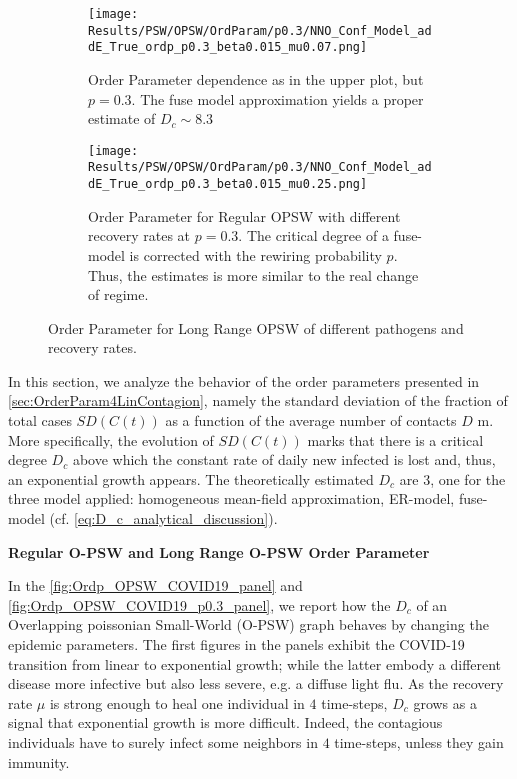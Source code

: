 \documentclass[a4paper,10pt,twoside]{book} %
\theoremstyle{definition}
\begin{document}
\begin{figure}[t]
	\begin{subfigure}[t]{0.48\linewidth}
		\texttt{[image: Results/PSW/OPSW/OrdParam/p0.3/NNO\_Conf\_Model\_addE\_True\_ordp\_p0.3\_beta0.015\_mu0.07.png]}
		\caption{Order Parameter dependence as in the upper plot, but $ p = 0.3$. The fuse model approximation yields a proper estimate of $ D_c \sim 8.3$}
		\label{fig:Ordp_OPSW_Dc8.3_p0.3}
	\end{subfigure}
	\begin{subfigure}[t]{0.48\linewidth}
		\texttt{[image: Results/PSW/OPSW/OrdParam/p0.3/NNO\_Conf\_Model\_addE\_True\_ordp\_p0.3\_beta0.015\_mu0.25.png]}
		\caption{Order Parameter for Regular OPSW with different recovery rates at $p = 0.3$.
		The critical degree of a fuse-model is corrected with the rewiring probability $ p$. Thus, the estimates is more similar to the real change of regime.}
		\label{fig:Ordp_OPSW_highmu_p0.3}
	\end{subfigure}
	\caption{Order Parameter for Long Range OPSW of different pathogens and recovery rates.}
	\label{fig:Ordp_OPSW_COVID19_p0.3_panel}
\end{figure}

In this section, we analyze the behavior of the order parameters presented in \autoref{sec:OrderParam4LinContagion}, namely the standard deviation of the fraction of total cases $SD(C(t))$ as a function of the average number of contacts $D$ m. More specifically, the evolution of $SD(C(t))$ marks that there is a critical degree $D_c$ above which the constant rate of daily new infected is lost and, thus, an exponential growth appears. The theoretically estimated $D_c$ are 3, one for the three model applied: homogeneous mean-field approximation, ER-model, fuse-model (cf. \autoref{eq:D_c_analytical_discussion}).

\textbf{Regular O-PSW and Long Range O-PSW Order Parameter}

In the \autoref{fig:Ordp_OPSW_COVID19_panel} and \autoref{fig:Ordp_OPSW_COVID19_p0.3_panel}, we report how the $D_c$ of an Overlapping poissonian Small-World (O-PSW) graph behaves by changing the epidemic parameters. The first figures in the panels exhibit the COVID-19 transition from linear to exponential growth; while the latter embody a different disease more infective but also less severe, e.g. a diffuse light flu. As the recovery rate $ \mu$ is strong enough to heal one individual in $ 4$  time-steps, $D_c$ grows as a signal that exponential growth is more difficult. Indeed, the contagious individuals have to surely infect some neighbors in $4$ time-steps, unless they gain immunity.  
\end{document}
